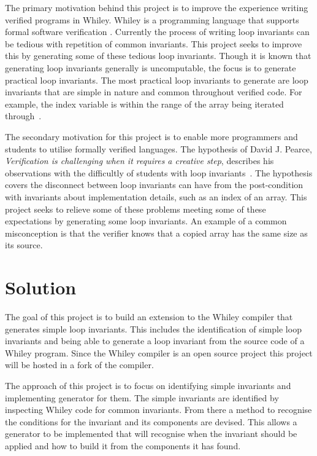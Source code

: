 The primary motivation behind this project is to improve the experience writing
verified programs in Whiley.
Whiley is a programming language that supports formal software verification \cite{whiley-origin}.
Currently the process of writing loop invariants can be tedious with 
repetition of common invariants.
This project seeks to improve this by generating some of these tedious loop invariants.
Though it is known that generating loop invariants generally is uncomputable,
the focus is to generate practical loop invariants.
The most practical loop invariants to generate are loop invariants that
are simple in nature and common throughout verified code.
For example, the index variable is within the range of the array being
iterated through~\cite{loop-patterns}.

The secondary motivation for this project is to enable more programmers and
students to utilise formally verified languages.
The hypothesis of David J. Pearce, \textit{Verification is challenging when it requires a creative step},
describes his observations with the difficultly of students with loop invariants~\cite{spec-usability}.
The hypothesis covers the disconnect between loop invariants can have from the
post-condition with invariants about implementation details, such as an index
of an array.
This project seeks to relieve some of these problems meeting some of these
expectations by generating some loop invariants.
An example of a common misconception is that the verifier knows that a copied
array has the same size as its source.

\section{Solution}

The goal of this project is to build an extension to
the Whiley compiler that generates simple loop invariants.
This includes the identification of simple loop invariants and being able
to generate a loop invariant from the source code of a Whiley program.
Since the Whiley compiler is an open source project this project will be
hosted in a fork of the compiler.

The approach of this project is to focus on identifying simple invariants
and implementing generator for them.
The simple invariants are identified by inspecting Whiley code for common
invariants. 
From there a method to recognise the conditions for the invariant and
its components are devised.
This allows a generator to be implemented that will recognise when
the invariant should be applied and how to build it from the components
it has found. 

